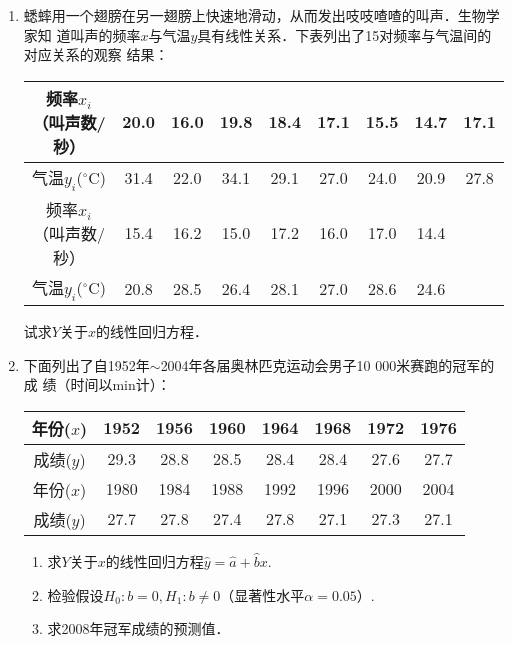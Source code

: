 \documentclass[10pt,a4paper]{article}
\begin{document}
\begin{enumerate}
    \item 蟋蟀用一个翅膀在另一翅膀上快速地滑动，从而发出吱吱喳喳的叫声．生物学家知
    道叫声的频率$x$与气温$y$具有线性关系．下表列出了15对频率与气温间的对应关系的观察
    结果：
    \renewcommand{\arraystretch}{1.3}
    \begin{table}[H]\centering
        \begin{tabular}{c|cccccccc}
        \hline
        频率$x_i$（叫声数/秒） & 20.0 & 16.0 & 19.8 & 18.4 & 17.1 & 15.5 & 14.7 & 17.1 \\ \hline
        气温$y_i$($^{\circ}$C)     & 31.4 & 22.0 & 34.1 & 29.1 & 27.0 & 24.0 & 20.9 & 27.8 \\ \hline
        频率$x_i$（叫声数/秒） & 15.4 & 16.2 & 15.0 & 17.2 & 16.0 & 17.0 & 14.4 &      \\ \hline
        气温$y_i$($^{\circ}$C)     & 20.8 & 28.5 & 26.4 & 28.1 & 27.0 & 28.6 & 24.6 &      \\ \hline
        \end{tabular}
    \end{table}
    \renewcommand{\arraystretch}{1.0}
    试求$Y$关于$x$的线性回归方程．




    \item 下面列出了自1952年$\sim$2004年各届奥林匹克运动会男子10 000米赛跑的冠军的成
    绩（时间以min计）：
    \renewcommand{\arraystretch}{1.3}
    \begin{table}[H]\centering
        \begin{tabular}{c|ccccccc}
        \hline
        年份($x$) & 1952 & 1956 & 1960 & 1964 & 1968 & 1972 & 1976 \\ \hline
        成绩($y$) & 29.3 & 28.8 & 28.5 & 28.4 & 28.4 & 27.6 & 27.7 \\ \hline
        年份($x$) & 1980 & 1984 & 1988 & 1992 & 1996 & 2000 & 2004 \\ \hline
        成绩($y$) & 27.7 & 27.8 & 27.4 & 27.8 & 27.1 & 27.3 & 27.1 \\ \hline
        \end{tabular}
    \end{table}
    \renewcommand{\arraystretch}{1.0}
    \begin{enumerate}
        \item 求$Y$关于$x$的线性回归方程$\hat{y}=\hat{a}+\hat{b}x$.
        \item 检验假设$H_0:b=0,H_1:b\neq 0$（显著性水平$\alpha=0.05$）.
        \item 求2008年冠军成绩的预测值．
    \end{enumerate}




\end{enumerate}
\end{document}
